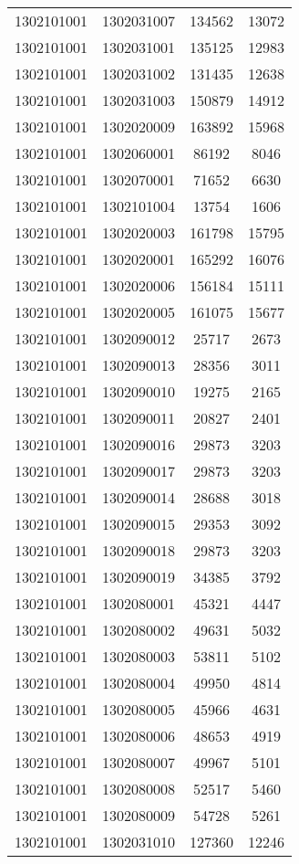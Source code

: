 \begin{longtable}{llcc}
1302101001 & 1302031007 & 134562 & 13072\\
1302101001 & 1302031001 & 135125 & 12983\\
1302101001 & 1302031002 & 131435 & 12638\\
1302101001 & 1302031003 & 150879 & 14912\\
1302101001 & 1302020009 & 163892 & 15968\\
1302101001 & 1302060001 & 86192 & 8046\\
1302101001 & 1302070001 & 71652 & 6630\\
1302101001 & 1302101004 & 13754 & 1606\\
1302101001 & 1302020003 & 161798 & 15795\\
1302101001 & 1302020001 & 165292 & 16076\\
1302101001 & 1302020006 & 156184 & 15111\\
1302101001 & 1302020005 & 161075 & 15677\\
1302101001 & 1302090012 & 25717 & 2673\\
1302101001 & 1302090013 & 28356 & 3011\\
1302101001 & 1302090010 & 19275 & 2165\\
1302101001 & 1302090011 & 20827 & 2401\\
1302101001 & 1302090016 & 29873 & 3203\\
1302101001 & 1302090017 & 29873 & 3203\\
1302101001 & 1302090014 & 28688 & 3018\\
1302101001 & 1302090015 & 29353 & 3092\\
1302101001 & 1302090018 & 29873 & 3203\\
1302101001 & 1302090019 & 34385 & 3792\\
1302101001 & 1302080001 & 45321 & 4447\\
1302101001 & 1302080002 & 49631 & 5032\\
1302101001 & 1302080003 & 53811 & 5102\\
1302101001 & 1302080004 & 49950 & 4814\\
1302101001 & 1302080005 & 45966 & 4631\\
1302101001 & 1302080006 & 48653 & 4919\\
1302101001 & 1302080007 & 49967 & 5101\\
1302101001 & 1302080008 & 52517 & 5460\\
1302101001 & 1302080009 & 54728 & 5261\\
1302101001 & 1302031010 & 127360 & 12246\\

\end{longtable}
